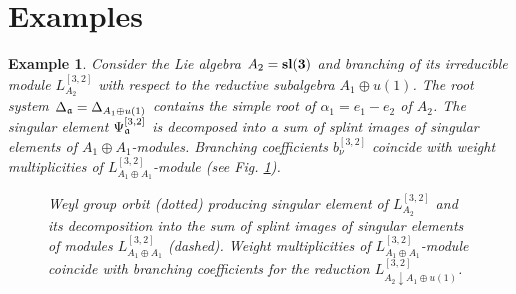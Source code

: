 \documentclass[12pt]{article}
\newtheorem{example}{Example}[section]
\begin{document}
\section{Examples}
\label{sec:examples}
\begin{example}
  Consider the Lie algebra $A_{2} =\bf{sl}(3)$ and branching of its irreducible module $L^{[3,2]}_{A_{2}}$ with respect to the reductive subalgebra $A_{1}\oplus u(1)$. The root system  $\Delta _{\frak{a}}= \Delta_{A_{1}\oplus u(1)}$ contains the simple root of $\alpha_1=e_1-e_2$ of $A_{2}$. The singular element $\Psi^{[3,2]}_{\frak{a}}$ is decomposed into a sum of splint images of singular elements of $A_{1}\oplus A_{1}$-modules. Branching coefficients $b_{\nu }^{[ 3,2 ] }$ coincide with weight multiplicities of $L^{[3,2]}_{A_{1}\oplus A_{1}}$-module (see Fig. \ref{fig:a2_splint}).

  \begin{figure}[h!bt]
  \noindent{}
  \caption{Weyl group orbit (dotted) producing singular element of $L^{[3,2]}_{A_{2}}$ and its decomposition into the sum of splint images of singular elements of modules  $L^{[3,2]}_{A_{1}\oplus A_{1}}$ (dashed). Weight multiplicities of $L^{[3,2]}_{A_{1}\oplus A_{1}}$-module coincide with branching coefficients for the reduction $L^{[3,2]}_{A_{2}\downarrow A_{1}\oplus u(1)}$.}

 \label{fig:a2_splint}
\end{figure}
\end{example}
\end{document}
